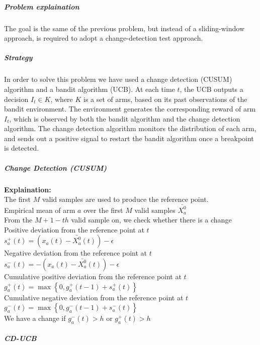 \subparagraph*{Problem explaination}
The goal is the same of the previous problem, but instead of a sliding-window approach, is required to adopt a change-detection test approach.
\subparagraph*{Strategy}
In order to solve this problem we have used a change detection (CUSUM) algorithm and a bandit algorithm (UCB). At each time $t$, the UCB outputs a decision $I_t \in K$, where $K$ is a set of arms, based on its past observations of the bandit environment. The environment generates the corresponding reward of arm $I_t$, which is observed by both the bandit algorithm and the change detection algorithm. The change detection algorithm monitors the distribution of each arm, and sends out a positive signal to restart the bandit algorithm once a breakpoint is detected.

\subparagraph*{Change Detection (CUSUM)}

\textbf{Explaination:}\\

The first $M$ valid samples are used to produce the reference point.\\

Empirical mean of arm $a$ over the first $M$ valid samples $\bar{X_{a}^0}$\\

From the $M + 1-th$ valid sample on, we check whether there is a change\\

Positive deviation from the reference point at $t$ \hspace{0.2cm} $s_{a}^{+}(t) = (x_{a}(t) - \bar{X_{a}^0}(t)) - \epsilon$ \\

Negative deviation from the reference point at $t$ \hspace{0.2cm} $s_{a}^{-}(t) = -  (x_{a}(t) - \bar{X_{a}^0}(t)) - \epsilon$ \\

Cumulative positive deviation from the reference point at $t$ \hspace{0.2cm} $g_{a}^{+}(t) = \max \left\{0, g_{a}^{+}(t-1) + s_{a}^{+}(t) \right\}$ \\

Cumulative negative deviation from the reference point at $t$ \hspace{0.2cm} $g_{a}^{-}(t) = \max \left\{0, g_{a}^{-}(t-1) + s_{a}^{-}(t) \right\}$ \\

We have a change if \hspace{0.2cm} $g_{a}^{-}(t) > h$ or $g_{a}^{+}(t) > h$\\
\subparagraph*{CD-UCB}

